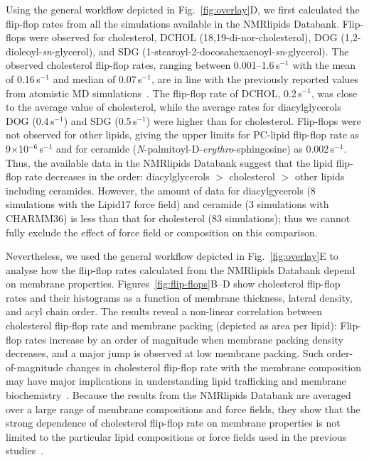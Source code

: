\documentclass[fleqn,10pt]{wlscirep}
\begin{document}
Using the general workflow depicted in Fig.~\ref{fig:overlay}D, we first calculated the flip-flop rates from all the simulations available in the NMRlipids Databank. Flip-flops were observed for cholesterol, DCHOL (18,19-di-nor-cholesterol), DOG (1,2-dioleoyl-\textit{sn}-glycerol), and SDG (1-stearoyl-2-docosahexaenoyl-\textit{sn}-glycerol). The observed cholesterol flip-flop rates, ranging between 0.001--1.6\,\textmu{}s$^{-1}$ with the mean of 0.16\,\textmu{}s$^{-1}$ and median of 0.07\,\textmu{}s$^{-1}$, are in line with the previously reported values from atomistic MD simulations~\cite{gu19,javanainen19,baral20}. The flip-flop rate of DCHOL, 0.2\,\textmu{}s$^{-1}$, was close to the average value of cholesterol, while the average rates for diacylglycerols DOG (0.4\,\textmu{}s$^{-1}$) and SDG (0.5\,\textmu{}s$^{-1}$) were higher than for cholesterol. Flip-flops were not observed for other lipids, giving the upper limits for PC-lipid flip-flop rate as 9$\times$10$^{-6}$\,\textmu{}s$^{-1}$ and for ceramide (\textit{N}-palmitoyl-\textsc{D}-\textit{erythro}-sphingosine) as 0.002\,\textmu{}s$^{-1}$. Thus, the available data in the NMRlipids Databank suggest that the lipid flip-flop rate decreases in the order: diacylglycerols $>$ cholesterol $>$ other lipids including ceramides. However, the amount of data for diacylgycerols (8 simulations with the Lipid17 force field) and ceramide (3 simulations with CHARMM36) is less than that for cholesterol (83 simulations); thus we cannot fully exclude the effect of force field or composition on this comparison.

Nevertheless, we used the general workflow depicted in Fig.~\ref{fig:overlay}E to analyse how the flip-flop rates calculated from the NMRlipids Databank depend on membrane properties. Figures~\ref{fig:flip-flops}B--D show cholesterol flip-flop rates and their histograms as a function of membrane thickness, lateral density, and acyl chain order. The results reveal a non-linear correlation between cholesterol flip-flop rate and membrane packing (depicted as area per lipid): Flip-flop rates increase by an order of magnitude when membrane packing density decreases, and a major jump is observed at low membrane packing. Such order-of-magnitude changes in cholesterol flip-flop rate with the membrane composition may have major implications in understanding lipid trafficking and membrane biochemistry~\cite{gu19,baral20}. Because the results from the NMRlipids Databank are averaged over a large range of membrane compositions and force fields, they show that the strong dependence of cholesterol flip-flop rate on membrane properties is not limited to the particular lipid compositions or force fields used in the previous studies~\cite{gu19,javanainen19,baral20}.
\end{document}
